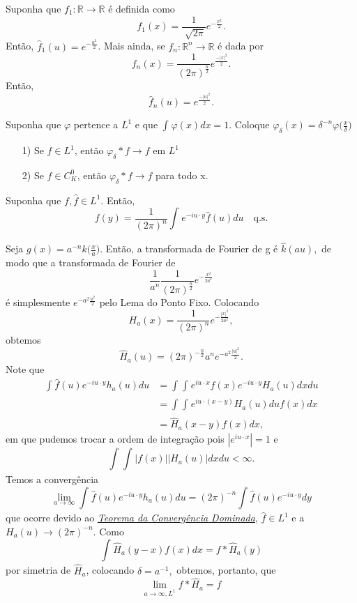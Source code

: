 \documentclass[MeasureTheory/measure_theory.tex]{subfiles}
\begin{document}
\begin{lemma*}
	Suponha que \(f_1:\mathbb{R}\rightarrow \mathbb{R}\) é definida como
	\[
		f_1(x) = \frac{1}{\sqrt[]{2\pi }}e^{-\frac{x^{2}}{2}}.
	\]
	Então, \(\hat{f}_{1}(u) = e^{-\frac{u^{2}}{2}}\).
	Mais ainda, se \(f_{n}:\mathbb{R}^{n}\rightarrow \mathbb{R}\) é dada por
	\[
		f_{n}(x) = \frac{1}{(2\pi )^{\frac{n}{2}}}e^{\frac{-|x|^{2}}{2}}.
	\]
	Então,
	\[
		\hat{f}_{n}(u) = e^{\frac{-|u|^{2}}{2}}.
	\]
\end{lemma*}
\begin{lemma*}
	Suponha que \(\varphi \) pertence a \(L^{1}\) e que \(\int_{}^{}\varphi (x)dx = 1\). Coloque \(\varphi_{\delta }(x) = \delta ^{-n}\varphi \biggl(\frac{x}{\delta }\biggr)\)
	\begin{itemize}
		\item[1)] Se \(f\in L^{1}\), então \(\varphi_\delta * f\to f\) em \(L^{1}\)
		\item[2)] Se \(f\in C_{K}^{0}\), então \(\varphi_{\delta }*f\to f\) para todo x.
	\end{itemize}
\end{lemma*}
\hypertarget{inversion}{
	\begin{theorem*}
		Suponha que \(f, \hat{f}\in L^{1}.\) Então,
		\[
			f(y) = \frac{1}{(2\pi )^{n}}\int_{}^{}e^{-iu \cdot y}\hat{f}(u)du \quad \text{q.s.}
		\]
	\end{theorem*}}
\begin{proof*}
	Seja \(g(x) = a^{-n}k \biggl(\frac{x}{a}\biggr).\) Então, a transformada de Fourier de g é \(\hat{k}(au),\) de modo que a transformada de Fourier de
	\[
		\frac{1}{a^{n}}\frac{1}{(2\pi )^{\frac{n}{2}}}e^{-\frac{x^{2}}{2a^{2}}}
	\]
	é simplesmente \(e^{-a^{2}\frac{u^{2}}{2}}\) pelo Lema do Ponto Fixo. Colocando
	\[
		H_{a}(x) = \frac{1}{(2\pi )^{n}}e^{-\frac{|x|^{2}}{2a^{2}}},
	\]
	obtemos
	\[
		\hat{H}_{a}(u) = (2\pi )^{-\frac{n}{2}}a^{n}e^{-a^{2}\frac{|u|^{2}}{2}}.
	\]
	Note que
	\begin{align*}
		\int_{}^{}\hat{f}(u)e^{-iu \cdot y}h_{a}(u)du & = \int_{}^{}\int_{}^{}e^{iu \cdot x}f(x)e^{-iu \cdot y}H_{a}(u)dxdu \\
		                                              & = \int_{}^{}\int_{}^{}e^{iu \cdot (x-y)}H_{a}(u)duf(x)dx            \\
		                                              & = \hat{H}_{a}(x-y)f(x)dx,
	\end{align*}
	em que pudemos trocar a ordem de integração pois \(|e^{iu \cdot x}| = 1\) e
	\[
		\int_{}^{}\int_{}^{}|f(x)||H_a(u)|dxdu < \infty.
	\]
	Temos a convergência
	\[
		\lim_{a\to \infty}\int_{}^{}\hat{f}(u)e^{-iu \cdot y}h_{a}(u)du =(2\pi )^{-n}\int_{}^{}\hat{f}(u)e^{-iu \cdot y}dy
	\]
	que ocorre devido ao \hyperlink{dominated_convergence}{\textit{Teorema da Convergência Dominada}}, \(\hat{f}\in L^{1}\) e a \(H_{a}(u)\to (2\pi )^{-n}\). Como
	\[
		\int_{}^{}\hat{H}_{a}(y-x)f(x)dx = f*\hat{H}_{a}(y)
	\]
	por simetria de \(\hat{H}_{a}\), colocando \(\delta  = a^{-1},\) obtemos, portanto, que
	\[
		\lim_{a\to \infty, L^{1}}f*\hat{H}_{a} = f
	\]
\end{proof*}
\end{document}
